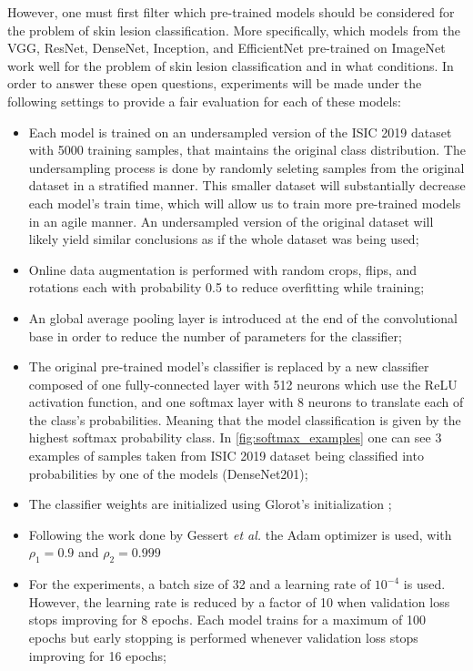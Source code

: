     However, one must first filter which pre-trained models should be considered for the problem of skin lesion classification. More specifically, which models from the VGG, ResNet, DenseNet, Inception, and EfficientNet pre-trained on ImageNet work well for the problem of skin lesion classification and in what conditions. In order to answer these open questions, experiments will be made under the following settings to provide a fair evaluation for each of these models:
    \begin{itemize}
        \item Each model is trained on an undersampled version of the \ac{ISIC} 2019 dataset with 5000 training samples, that maintains the original class distribution. The undersampling process is done by randomly seleting samples from the original dataset in a stratified manner. This smaller dataset will substantially decrease each model's train time, which will allow us to train more pre-trained models in an agile manner. An undersampled version of the original dataset will likely yield similar conclusions as if the whole dataset was being used;
        \item Online data augmentation is performed with random crops, flips, and rotations each with probability 0.5 to reduce overfitting while training;
        \item An global average pooling layer is introduced at the end of the convolutional base in order to reduce the number of parameters for the classifier;
        \item The original pre-trained model's classifier is replaced by a new classifier composed of one fully-connected layer with 512 neurons which use the ReLU activation function, and one softmax layer with 8 neurons to translate each of the class's probabilities. Meaning that the model classification is given by the highest softmax probability class. In \autoref{fig:softmax_examples} one can see 3 examples of samples taken from \ac{ISIC} 2019 dataset being classified into probabilities by one of the models (DenseNet201);
        \item The classifier weights are initialized using Glorot's initialization \cite{Glorot2010};
        \item Following the work done by Gessert \textit{et al.} \cite{gessert2018} the Adam optimizer \cite{adam} is used, with $\rho_{1} = 0.9$ and $\rho_{2}=0.999$
        \item For the experiments, a batch size of 32 and a learning rate of $10^{-4}$ is used. However, the learning rate is reduced by a factor of 10 when validation loss stops improving for 8 epochs. Each model trains for a maximum of 100 epochs but early stopping is performed whenever validation loss stops improving for 16 epochs;

\end{itemize}
